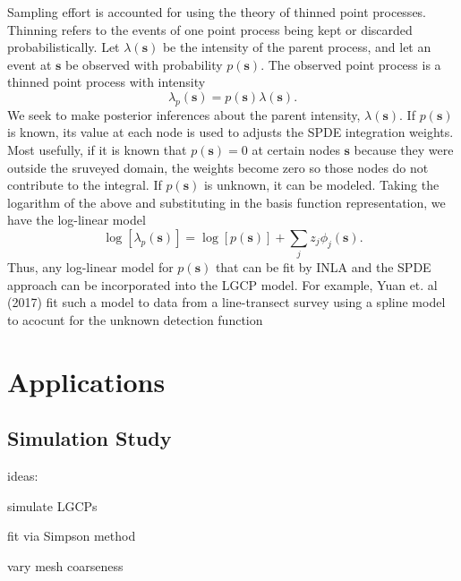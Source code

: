 \documentclass[]{interact}
\begin{document}
Sampling effort is accounted for using the theory of thinned point processes.
Thinning refers to the events of one point process being kept or discarded
probabilistically. Let \(\lambda(\mathbf{s})\) be the intensity of the parent
process, and let an event at \(\mathbf{s}\) be observed with probability
\(p(\mathbf{s})\). The observed point process is a thinned point process with
intensity
\begin{displaymath}
\lambda_{p}(\mathbf{s}) = p(\mathbf{s}) \lambda(\mathbf{s}).
\end{displaymath}
We seek to make posterior inferences about the parent intensity,
 \(\lambda(\mathbf{s})\). If \(p(\mathbf{s})\) is known, its value at each node
is used to adjusts the SPDE integration weights. Most usefully, if it is known
that \(p(\mathbf{s}) = 0\) at certain nodes \(\mathbf{s}\) because they were
outside the sruveyed domain, the weights become zero so those nodes do not
contribute to the integral. If \(p(\mathbf{s})\) is unknown, it can be modeled.
Taking the logarithm of the above and substituting in the basis function
representation, we have the log-linear model
\begin{displaymath}
\log\left[\lambda_{p}(\mathbf{s})\right]
= \log\left[p(\mathbf{s})\right] + \sum_{j} z_{j} \phi_{j}(\mathbf{s}).
\end{displaymath}
Thus, any log-linear model for \(p(\mathbf{s})\) that can be fit by INLA and
the SPDE approach can be incorporated into the LGCP model. For example, Yuan
et. al (2017) fit such a model to data from a line-transect survey using a
spline model to acocunt for the unknown detection function~\cite{yuanetal}


\section{Applications}


\subsection{Simulation Study}

ideas:

simulate LGCPs

fit via Simpson method

vary mesh coarseness
\end{document}
